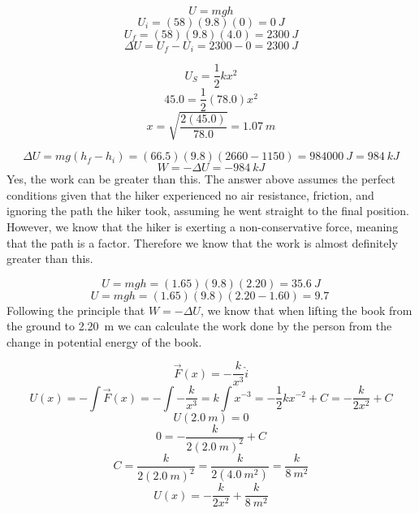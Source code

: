 \documentclass[11pt]{homework}
\begin{document}
\maketitle

\renewcommand{\questiontype}{Problem}
\setcounter{questionCounter}{0}

\question
\[
U = mgh
\]\[
U_i = (58)(9.8)(0) = \qty{0}{J}
\]\[
U_f= (58)(9.8)(4.0) = \qty{2300}{J}
\]\[
\Delta U = U_f - U_i = 2300 - 0 = \boxed{\qty{2300}{J}}
\]

\setcounter{questionCounter}{2}
\question
\[
U_S = \frac{1}{2}kx^2
\]\[
45.0 = \frac{1}{2}(78.0)x^2
\]\[
x = \sqrt{\frac{2(45.0)}{78.0}} = \boxed{\qty{1.07}{m}}
\]

\question
\begin{alphaparts}
    \questionpart
        \[
            \Delta U = mg(h_f-h_i) = (66.5)(9.8)(2660-1150) = \qty{984000}{J} = \boxed{\qty{984}{kJ}}
        \]
    \questionpart
        \[
            W = -\Delta U = \qty{-984}{kJ}
        \]
    \questionpart
        Yes, the work can be greater than this. The answer above assumes the perfect conditions given that the hiker experienced no air resistance, friction, and ignoring the path the hiker took, assuming he went straight to the final position. However, we know that the hiker is exerting a non-conservative force, meaning that the path is a factor. Therefore we know that the work is almost definitely greater than this.
\end{alphaparts}

\setcounter{questionCounter}{5}
\question
\begin{alphaparts}
    \questionpart
        \[
        U = mgh = (1.65)(9.8)(2.20) = \boxed{\qty{35.6}{J}}
        \]
    \questionpart
        \[
            U = mgh = (1.65)(9.8)(2.20-1.60)=\boxed{\qty{9.7}{}}
        \]
    \questionpart
    Following the principle that $W = -\Delta U$, we know that when lifting the book from the ground to \qty{2.20}{m} we can calculate the work done by the person from the change in potential energy of the book.
\end{alphaparts}


\question
\[
\vec{F}(x)=-\frac{k}{x^3}\hat{i}
\]\[
U(x) = -\int \vec{F}(x) = -\int-\frac{k}{x^3}=k \int x^{-3}  = -\frac{1}{2}kx^{-2}+C=-\frac{k}{2x^2}+C
\]\[
U(\qty{2.0}{m})=0
\]\[
0=-\frac{k}{2(\qty{2.0}{m})^2}+C
\]\[
C=\frac{k}{2(\qty{2.0}{m})^2}=\frac{k}{2(\qty{4.0}{m^2})}=\frac{k}{\qty{8}{m^2}}
\]\[
U(x)=\boxed{-\frac{k}{2x^2}+\frac{k}{\qty{8}{m^2}}}
\]
\end{document}
